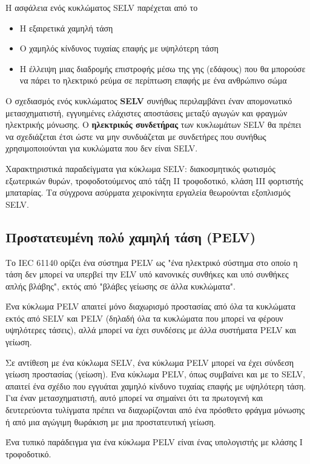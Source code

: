 \documentclass[11pt,a4paper,notitlepage,fleqn]{article}
\begin{document}
Η ασφάλεια ενός κυκλώματος SELV παρέχεται από το


\begin{itemize}
	\item     Η εξαιρετικά χαμηλή τάση
	\item     Ο χαμηλός κίνδυνος τυχαίας επαφής με υψηλότερη τάση
	\item     Η έλλειψη μιας διαδρομής επιστροφής μέσω της γης (εδάφους) που θα μπορούσε να πάρει το ηλεκτρικό ρεύμα σε περίπτωση επαφής με ένα ανθρώπινο σώμα
\end{itemize}

Ο σχεδιασμός ενός κυκλώματος \textbf{SELV} συνήθως περιλαμβάνει έναν απομονωτικό μετασχηματιστή, εγγυημένες ελάχιστες αποστάσεις μεταξύ αγωγών και φραγμών ηλεκτρικής μόνωσης. Ο \textbf{ηλεκτρικός συνδετήρας }των κυκλωμάτων SELV θα πρέπει να σχεδιάζεται έτσι ώστε να μην συνδυάζεται με συνδετήρες που συνήθως χρησιμοποιούνται για κυκλώματα που δεν είναι SELV.

Χαρακτηριστικά παραδείγματα για κύκλωμα SELV: διακοσμητικός φωτισμός εξωτερικών θυρών, τροφοδοτούμενος από τάξη II τροφοδοτικό, κλάση III φορτιστής μπαταρίας. Τα σύγχρονα ασύρματα χειροκίνητα εργαλεία θεωρούνται εξοπλισμός SELV. 

\subsection{Προστατευμένη πολύ χαμηλή τάση (PELV)}

Το IEC 61140 ορίζει ένα σύστημα PELV ως "ένα ηλεκτρικό σύστημα στο οποίο η τάση δεν μπορεί να υπερβεί την ELV υπό κανονικές συνθήκες και υπό συνθήκες απλής βλάβης", εκτός από "βλάβες γείωσης σε άλλα κυκλώματα".

Ένα κύκλωμα PELV απαιτεί μόνο διαχωρισμό προστασίας από όλα τα κυκλώματα εκτός από SELV και PELV (δηλαδή όλα τα κυκλώματα που μπορεί να φέρουν υψηλότερες τάσεις), αλλά μπορεί να έχει συνδέσεις με άλλα συστήματα PELV και γείωση.

Σε αντίθεση με ένα κύκλωμα SELV, ένα κύκλωμα PELV μπορεί να έχει σύνδεση γείωση προστασίας (γείωση). Ένα κύκλωμα PELV, όπως συμβαίνει και με το SELV, απαιτεί ένα σχέδιο που εγγυάται χαμηλό κίνδυνο τυχαίας επαφής με υψηλότερη τάση. Για έναν μετασχηματιστή, αυτό μπορεί να σημαίνει ότι τα πρωτογενή και δευτερεύοντα τυλίγματα πρέπει να διαχωρίζονται από ένα πρόσθετο φράγμα μόνωσης ή από μια αγώγιμη θωράκιση με μια προστατευτική γείωση.

Ένα τυπικό παράδειγμα για ένα κύκλωμα PELV είναι ένας υπολογιστής με κλάσης I τροφοδοτικό.
\end{document}
